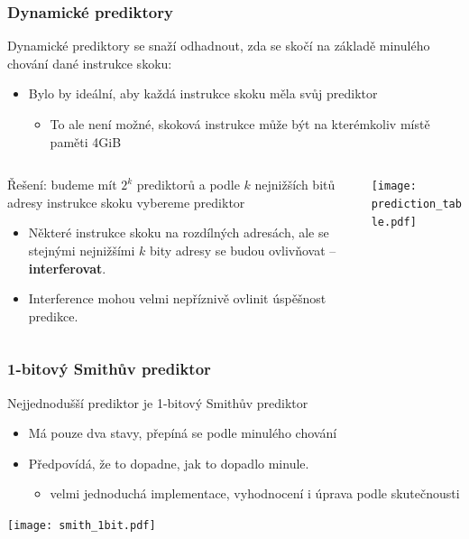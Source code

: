\documentclass{beamer}
\begin{document}
\begin{frame}
\frametitle{Dynamické prediktory}

\small
Dynamické prediktory se snaží odhadnout, zda se skočí na základě minulého chování dané instrukce skoku:
\begin{itemize}
\item Bylo by ideální, aby každá instrukce skoku měla svůj prediktor
\begin{itemize}
\small
\item To ale není možné, skoková instrukce může být na kterémkoliv místě paměti 4GiB
\end{itemize}
\end{itemize}


\begin{columns}[T]
\begin{column}{0.5\textwidth}
\small
Řešení: budeme mít $2^k$ prediktorů a podle $k$ nejnižších bitů adresy instrukce skoku vybereme prediktor
\begin{itemize}
\item Některé instrukce skoku na rozdílných adresách, ale se stejnými nejnižšími $k$ bity adresy se budou ovlivňovat -- \textbf{interferovat}.
\item Interference mohou velmi nepříznivě ovlinit úspěšnost predikce.
\end{itemize}
\end{column}
\begin{column}{0.5\textwidth}
\texttt{[image: prediction\_table.pdf]}
\end{column}
\end{columns}

\end{frame}


\begin{frame}
\frametitle{1-bitový Smithův prediktor}

Nejjednodušší prediktor je 1-bitový Smithův prediktor
\begin{itemize}
\item Má pouze dva stavy, přepíná se podle minulého chování
\item Předpovídá, že to dopadne, jak to dopadlo minule.
\begin{itemize}
\item velmi jednoduchá implementace, vyhodnocení i úprava podle skutečnousti
\end{itemize}
\end{itemize}

\begin{center}
\texttt{[image: smith\_1bit.pdf]}
\end{center}

\end{frame}
\end{document}
